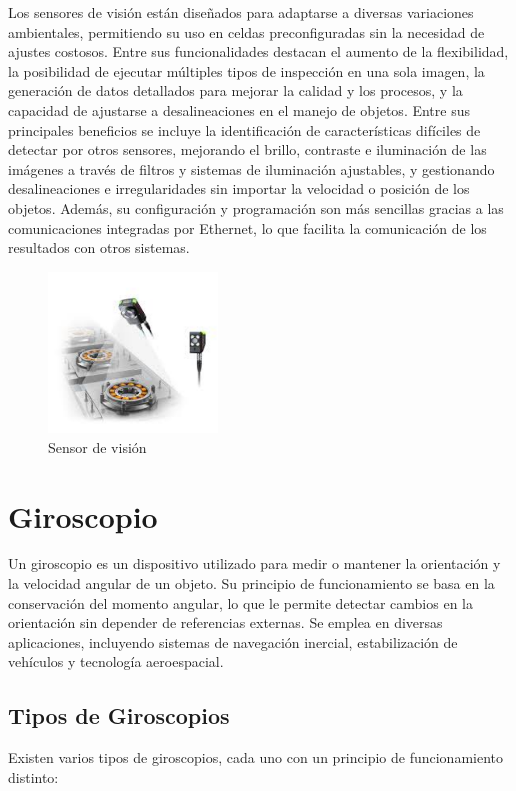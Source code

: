 \documentclass{article}
\begin{document}
\begin{itemize}
		Los sensores de visión están diseñados para adaptarse a diversas variaciones ambientales,
		permitiendo su uso en celdas preconfiguradas sin la necesidad de ajustes costosos. Entre
		sus funcionalidades destacan el aumento de la flexibilidad, la posibilidad de ejecutar
		múltiples tipos de inspección en una sola imagen, la generación de datos detallados para
		mejorar la calidad y los procesos, y la capacidad de ajustarse a desalineaciones en el
		manejo de objetos. Entre sus principales beneficios se incluye la identificación de
		características difíciles de detectar por otros sensores, mejorando el brillo, contraste e
		iluminación de las imágenes a través de filtros y sistemas de iluminación ajustables, y
		gestionando desalineaciones e irregularidades sin importar la velocidad o posición de los
		objetos. Además, su configuración y programación son más sencillas gracias a las
		comunicaciones integradas por Ethernet, lo que facilita la comunicación de los resultados
		con otros sistemas.
		\begin{figure}[H]
			\centering
			\includegraphics[width=0.4\textwidth]{sensorvision.png}
			\caption{Sensor de visión} 
		\end{figure}
	\end{itemize}
	
	\section{Giroscopio} Un giroscopio es un dispositivo utilizado para medir o mantener la orientación y la velocidad angular de un objeto. Su principio de funcionamiento se basa en la conservación del momento angular, lo que le permite detectar cambios en la orientación sin depender de referencias externas. Se emplea en diversas aplicaciones, incluyendo sistemas de navegación inercial, estabilización de vehículos y tecnología aeroespacial.
	\subsection{Tipos de Giroscopios}
	Existen varios tipos de giroscopios, cada uno con un principio de funcionamiento distinto:
	
\end{document}
